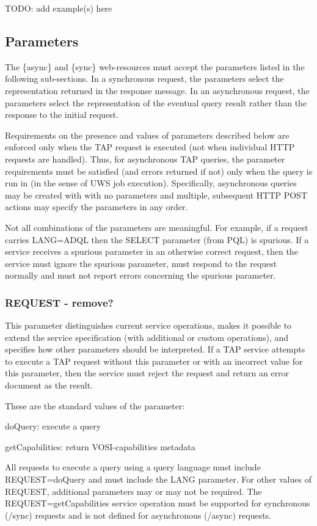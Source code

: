 \documentclass[11pt,letter]{ivoa}
\begin{document}
TODO: add example(s) here

\subsection{Parameters}
\label{sec:parameters}

The \{async\} and \{sync\} web-resources must accept the parameters listed in 
the following sub-sections. In a synchronous request, the parameters select the 
representation returned in the response message. In an asynchronous request, the 
parameters select the representation of the eventual query result rather than 
the response to the initial request.

Requirements on the presence and values of parameters described below are 
enforced only when the TAP request is executed (not when individual HTTP 
requests are handled). Thus, for asynchronous TAP queries, the parameter 
requirements must be satisfied (and errors returned if not) only when the query 
is run in (in the sense of UWS job execution). Specifically, asynchronous 
queries may be created with with no parameters and multiple, subsequent HTTP 
POST actions may specify the parameters in any order.

Not all combinations of the parameters are meaningful. For example, if a request 
carries  LANG=ADQL then the SELECT parameter (from PQL) is spurious. If a 
service receives a spurious parameter in an otherwise correct request, then the 
service must ignore the spurious parameter, must respond to the request normally 
and must not report errors concerning the spurious parameter.

\subsubsection{REQUEST - remove? }
This parameter distinguishes current service operations, makes it possible to 
extend the service specification (with additional or custom operations), and 
specifies how other parameters should be interpreted. If a TAP service attempts 
to execute a TAP request without this parameter or with an incorrect value for 
this parameter, then the service must reject the request and return an error 
document as the result.

These are the standard values of the parameter:

doQuery: execute a query 

getCapabilities: return VOSI-capabilities metadata 

All requests to execute a query using a query language must 
include REQUEST=doQuery and must include the LANG parameter. For other values of 
REQUEST, additional parameters may or may not be required. The 
REQUEST=getCapabilities service operation must be supported for synchronous 
(/sync) requests and is not defined for asynchronous (/async) requests.
\end{document}
